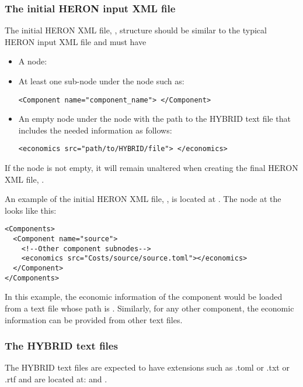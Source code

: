 \subsubsection{The initial HERON input XML file}
The initial HERON XML file, , structure should be similar to the typical HERON input XML file and must have
\begin{itemize}
\item A  node: 
\item At least one  sub-node under the  node such as:
\begin{lstlisting}[style=XML,morekeywords={class}]
<Component name="component_name"> </Component>
\end{lstlisting}   

\item An empty  node under the  node with the path to the HYBRID text file that includes the needed information as follows:
\begin{lstlisting}[style=XML,morekeywords={class}]
<economics src="path/to/HYBRID/file"> </economics>
\end{lstlisting}   
\end{itemize}
If the  node is not empty, it will remain unaltered when creating the final HERON XML file, .

An example of the initial HERON XML file, , is located at . 
The  node at the  looks like this:
\begin{lstlisting}[style=XML,morekeywords={class}]
<Components>
  <Component name="source">
    <!--Other component subnodes-->
    <economics src="Costs/source/source.toml"></economics>
  </Component>
</Components>
\end{lstlisting}
In this example, the economic information of the component  would be loaded from a text file whose path is . Similarly, for any other component, the economic information can be provided from other text files. 

\subsubsection{The HYBRID text files}
The HYBRID text files are expected to have extensions such as .toml or .txt or .rtf and are located at: 
 and 
. 

